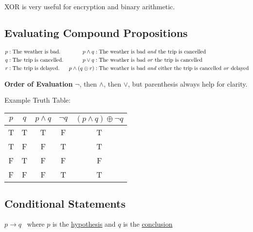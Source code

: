 \documentclass{article}
\begin{document}
XOR is very useful for encryption and binary arithmetic.

\subsection{Evaluating Compound Propositions}

\begin{align*}
  p & : \text{The weather is bad.}    & p \land q            & : \text{The weather is bad \textit{and} the trip is cancelled}                            \\
  q & : \text{The trip is cancelled.} & p \lor q             & : \text{The weather is bad \textit{or} the trip is cancelled}                             \\
  r & : \text{The trip is delayed.}   & p \land (q \oplus r) & : \text{The weather is bad \textit{and} either the trip is cancelled \textit{or} delayed} \\
\end{align*}

\textbf{Order of Evaluation} \(\lnot\), then \(\land\), then \(\lor\), but parenthesis always help for clarity.

\begin{center}
  Example Truth Table:
  \qquad
  \begin{tabular}{c|c|c|c|c}
    \(p\) & \(q\) & \(p \land q\) & \(\lnot q\) & \((p \land q) \oplus \lnot q\) \\
    \hline
    T     & T     & T             & F           & T                              \\
    T     & F     & F             & T           & T                              \\
    F     & T     & F             & F           & F                              \\
    F     & F     & F             & T           & T                              \\
  \end{tabular}
\end{center}

\subsection{Conditional Statements}

\begin{center}
  \(p \rightarrow q\) \ where \(p\) is the \underline{hypothesis} and \(q\) is the \underline{conclusion}
\end{center}
\end{document}
